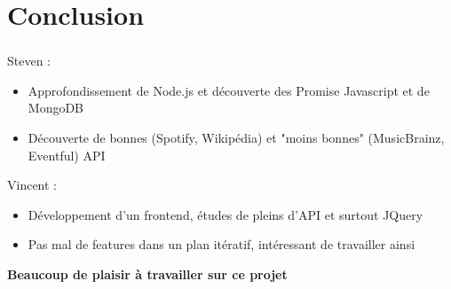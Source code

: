 \documentclass[10pt]{beamer}
\begin{document}
\section{Conclusion}
\begin{frame}
	\frametitle{\secname}
	Steven :
	\begin{itemize}
		\item Approfondissement de Node.js et découverte des Promise Javascript et de MongoDB
		\item Découverte de bonnes (Spotify, Wikipédia) et "moins bonnes" (MusicBrainz, Eventful) API
	\end{itemize}
	Vincent :
	\begin{itemize}
		\item Développement d'un frontend, études de pleins d'API et surtout JQuery
		\item Pas mal de features dans un plan itératif, intéressant de travailler ainsi
	\end{itemize}
	\Large\textbf{Beaucoup de plaisir à travailler sur ce projet}
\end{frame}
\end{document}
